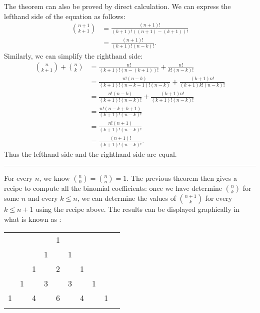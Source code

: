 \documentclass[letterpaper,10pt,english]{sphinxmanual}
\begin{document}
\sphinxAtStartPar
The theorem can also be proved by direct calculation. We can express the left\sphinxhyphen{}hand side of the equation as follows:
\begin{equation*}
\begin{split}\binom{n+1}{k+1} & = \frac{(n + 1)!}{(k+1)!((n+1)-(k+1))!} \\ & = \frac{(n + 1)!}{(k+1)!(n - k)!}.\end{split}
\end{equation*}
\sphinxAtStartPar
Similarly, we can simplify the right\sphinxhyphen{}hand side:
\begin{equation*}
\begin{split}\binom{n}{k+1} + \binom{n}{k} & = \frac{n!}{(k+1)!(n-(k+1))!} + \frac{n!}{k!(n-k)!} \\
& = \frac{n!(n-k)}{(k+1)!(n-k-1)!(n-k)} + \frac{(k+1)n!}{(k+1)k!(n-k)!} \\
& = \frac{n!(n-k)}{(k+1)!(n-k)!} + \frac{(k+1)n!}{(k+1)!(n-k)!} \\
& = \frac{n!(n-k + k + 1)}{(k+1)!(n-k)!} \\
& = \frac{n!(n + 1)}{(k+1)!(n-k)!} \\
& = \frac{(n + 1)!}{(k+1)!(n-k)!}.\end{split}
\end{equation*}
\sphinxAtStartPar
Thus the left\sphinxhyphen{}hand side and the right\sphinxhyphen{}hand side are equal.


\bigskip\hrule\bigskip


\sphinxAtStartPar
For every \(n\), we know \(\binom{n}{0} = \binom{n}{n} = 1\). The previous theorem then gives a recipe to compute all the binomial coefficients: once we have determine \(\binom{n}{k}\) for some \(n\) and every \(k \leq n\), we can determine the values of \(\binom{n+1}{k}\) for every \(k \leq n + 1\) using the recipe above. The results can be displayed graphically in what is known as :



\begin{center}
\begin{tabular}{rccccccccc}
    &    &    &    &  1 \\\noalign{\smallskip\smallskip}
    &    &    &  1 &    &  1 \\\noalign{\smallskip\smallskip}
    &    &  1 &    &  2 &    &  1 \\\noalign{\smallskip\smallskip}
    &  1 &    &  3 &    &  3 &    &  1 \\\noalign{\smallskip\smallskip}
  1 &    &  4 &    &  6 &    &  4 &    &  1 \\\noalign{\smallskip\smallskip}
\end{tabular}
\end{center}
\end{document}
